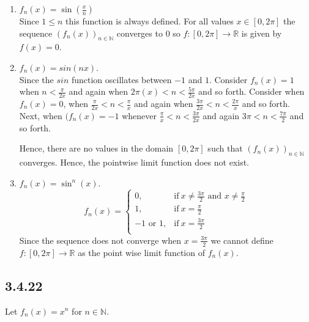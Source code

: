 \documentclass{tufte-book}
\theoremstyle{mytheoremstyle}
\theoremstyle{mylemstyle}
\theoremstyle{mydefstyle}
\begin{document}
\begin{enumerate}

\item $f_n(x) = \sin(\frac{x}{n})$\\
Since $1 \leq n$ this function is always defined.  For all values $x \in [0,2\pi]$ the sequence $(f_n(x))_{n \in \mathbb{N}}$ converges to $0$ so $f:[0,2\pi] \rightarrow \mathbb{R}$ is given by $f(x) = 0$.

\item $f_n(x) = sin(nx)$.\\
Since the $sin$ function oscillates between $-1$ and $1$.  Consider $f_n(x) = 1$ when $n < \frac{\pi}{2x}$ and again when $2\pi(x) < n < \frac{5\pi}{2x}$ and so forth. Consider when $f_n(x) = 0$,  when $\frac{\pi}{2x}<n<\frac{\pi}{x}$ and again  when $\frac{3\pi}{2x} < n < \frac{2\pi}{x}$ and so forth.  Next, when $(f_n(x) = -1$ whenever $\frac{\pi}{x}<n<\frac{3\pi}{2x}$ and again $3\pi < n < \frac{7\pi}{2}$ and so forth.

Hence, there are no values in the domain $[0, 2\pi]$ such that $(f_n(x))_{n \in \mathbb{N}}$ converges.  Hence, the pointwise limit function does not exist.

\item $f_n(x) = \sin^n(x)$.
\[f_n(x) = 
\begin{cases}
      0, & \text{if}\ x \neq \frac{3\pi}{2} \text{ and } x\neq \frac{\pi}{2} \\
      1, & \text{if}\ x = \frac{\pi}{2}\\
      -1 \text{ or } 1, & \text{if}\ x = \frac{3\pi}{2}\\
\end{cases}
\]
Since the sequence does not converge when $x = \frac{3\pi}{2}$ we cannot define $f: [0,2\pi] \rightarrow \mathbb{R}$ as the point wise limit function of $f_n(x)$.

\end{enumerate}

\subsection{3.4.22}
Let $f_n(x) = x^n$ for $n \in \mathbb{N}$.
\end{document}

